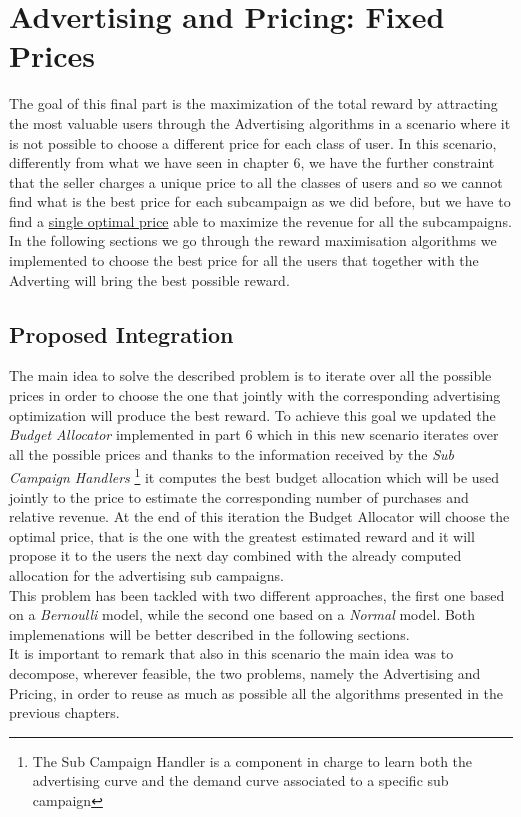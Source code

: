 \chapter{Advertising and Pricing: Fixed Prices}

The goal of this final part is the maximization of the total reward by attracting the most valuable users through the Advertising algorithms in a scenario where it is not possible to choose a different price for each class of user. In this scenario, differently from what we have seen in chapter 6, we have the further constraint that the seller charges a unique price to all the classes of users and so we cannot find what is the best price for each subcampaign as we did before, but we have to find a \underline{single optimal price} able to maximize the revenue for all the subcampaigns.\\ In the following sections we go through the reward maximisation algorithms we implemented to choose the best price for all the users that together with the Adverting will bring the best possible reward.


\section{Proposed Integration}
The main idea to solve the described problem is to iterate over all the possible prices in order to choose the one that jointly with the corresponding advertising optimization will produce the best reward.
To achieve this goal we updated the \textit{Budget Allocator} implemented in part 6 which in this new scenario iterates over all the possible prices and thanks to the information received by the \textit{Sub Campaign Handlers} \footnote{The Sub Campaign Handler is a component in charge to learn both the advertising curve and the demand curve associated to a specific sub campaign} it computes the best budget allocation which will be used jointly to the price to estimate the corresponding number of purchases and relative revenue. At the end of this iteration the Budget Allocator will choose the optimal price, that is the one with the greatest estimated reward and it will propose it to the users the next day combined with the already computed allocation for the advertising sub campaigns.\\ This problem has been tackled with two different approaches, the first one based on a \textit{Bernoulli} model, while the second one based on a \textit{Normal} model. Both implemenations will be better described in the following sections. \\It is important to remark that also in this scenario the main idea was to decompose, wherever feasible, the two problems, namely the Advertising and Pricing, in order to reuse as much as possible all the algorithms presented in the previous chapters.

